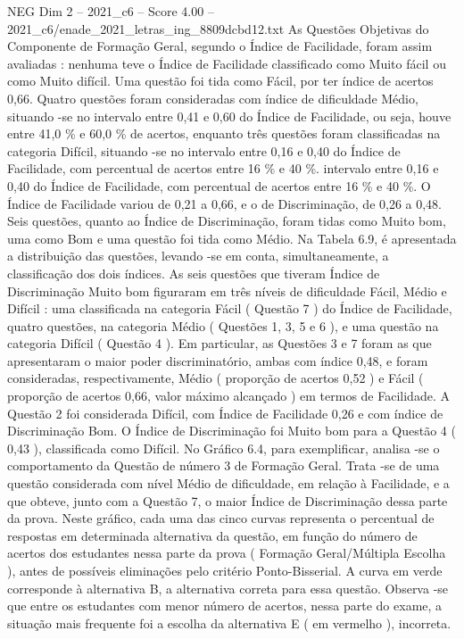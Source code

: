 \begin{textsample}{NEG Dim 2 – 2021\_c6 – Score 4.00 – 2021\_c6/enade\_2021\_letras\_ing\_8809dcbd12.txt}
As Questões Objetivas do Componente de Formação Geral, segundo o Índice de Facilidade, foram assim avaliadas : nenhuma teve o Índice de Facilidade classificado como Muito fácil ou como Muito difícil.
Uma questão foi tida como Fácil, por ter índice de acertos 0,66.
Quatro questões foram consideradas com índice de dificuldade Médio, situando -se no intervalo entre 0,41 e 0,60 do Índice de Facilidade, ou seja, houve entre 41,0 \% e 60,0 \% de acertos, enquanto três questões foram classificadas na categoria Difícil, situando -se no intervalo entre 0,16 e 0,40 do Índice de Facilidade, com percentual de acertos entre 16 \% e 40 \%. intervalo entre 0,16 e 0,40 do Índice de Facilidade, com percentual de acertos entre 16 \% e 40 \%.
O Índice de Facilidade variou de 0,21 a 0,66, e o de Discriminação, de 0,26 a 0,48.
Seis questões, quanto ao Índice de Discriminação, foram tidas como Muito bom, uma como Bom e uma questão foi tida como Médio.
Na Tabela 6.9, é apresentada a distribuição das questões, levando -se em conta, simultaneamente, a classificação dos dois índices.
As seis questões que tiveram Índice de Discriminação Muito bom figuraram em três níveis de dificuldade Fácil, Médio e Difícil : uma classificada na categoria Fácil ( Questão 7 ) do Índice de Facilidade, quatro questões, na categoria Médio ( Questões 1, 3, 5 e 6 ), e uma questão na categoria Difícil ( Questão 4 ).
Em particular, as Questões 3 e 7 foram as que apresentaram o maior poder discriminatório, ambas com índice 0,48, e foram consideradas, respectivamente, Médio ( proporção de acertos 0,52 ) e Fácil ( proporção de acertos 0,66, valor máximo alcançado ) em termos de Facilidade.
A Questão 2 foi considerada Difícil, com Índice de Facilidade 0,26 e com índice de Discriminação Bom.
O Índice de Discriminação foi Muito bom para a Questão 4 ( 0,43 ), classificada como Difícil.
No Gráfico 6.4, para exemplificar, analisa -se o comportamento da Questão de número 3 de Formação Geral.
Trata -se de uma questão considerada com nível Médio de dificuldade, em relação à Facilidade, e a que obteve, junto com a Questão 7, o maior Índice de Discriminação dessa parte da prova.
Neste gráfico, cada uma das cinco curvas representa o percentual de respostas em determinada alternativa da questão, em função do número de acertos dos estudantes nessa parte da prova ( Formação Geral/Múltipla Escolha ), antes de possíveis eliminações pelo critério Ponto-Bisserial.
A curva em verde corresponde à alternativa B, a alternativa correta para essa questão.
Observa -se que entre os estudantes com menor número de acertos, nessa parte do exame, a situação mais frequente foi a escolha da alternativa E ( em vermelho ), incorreta.

\end{textsample}
